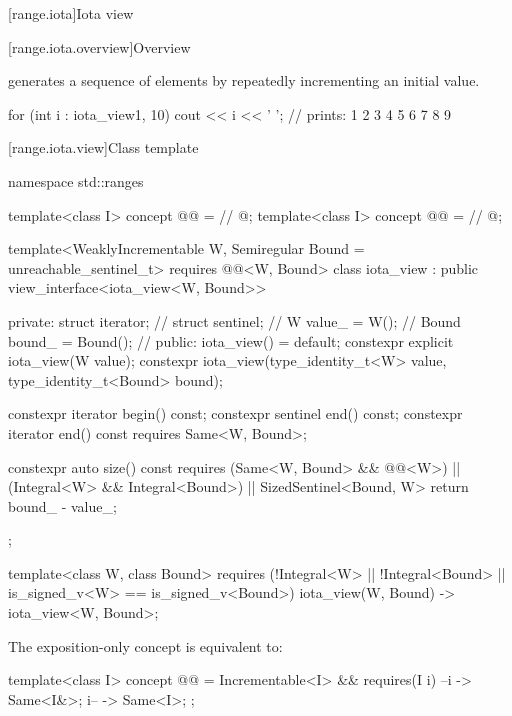 [range.iota]{Iota view}

[range.iota.overview]{Overview}

\pnum
{} generates a
sequence of elements by repeatedly incrementing an initial value.

\pnum
\begin{example}
\begin{codeblock}
for (int i : iota_view{1, 10})
  cout << i << ' '; // prints: 1 2 3 4 5 6 7 8 9
\end{codeblock}
\end{example}

[range.iota.view]{Class template }

\begin{codeblock}
namespace std::ranges {
  template<class I>
    concept @@ =     // \expos
      @\seebelow@;
  template<class I>
    concept @@ =       // \expos
      @\seebelow@;

  template<WeaklyIncrementable W, Semiregular Bound = unreachable_sentinel_t>
    requires @@<W, Bound>
  class iota_view : public view_interface<iota_view<W, Bound>> {
  private:
    struct iterator;            // \expos
    struct sentinel;            // \expos
    W value_ = W();             // \expos
    Bound bound_ = Bound();     // \expos
  public:
    iota_view() = default;
    constexpr explicit iota_view(W value);
    constexpr iota_view(type_identity_t<W> value,
                        type_identity_t<Bound> bound);

    constexpr iterator begin() const;
    constexpr sentinel end() const;
    constexpr iterator end() const requires Same<W, Bound>;

    constexpr auto size() const
      requires (Same<W, Bound> && @@<W>) ||
               (Integral<W> && Integral<Bound>) ||
               SizedSentinel<Bound, W>
    { return bound_ - value_; }
  };

  template<class W, class Bound>
    requires (!Integral<W> || !Integral<Bound> || is_signed_v<W> == is_signed_v<Bound>)
  iota_view(W, Bound) -> iota_view<W, Bound>;
}
\end{codeblock}

\pnum
The exposition-only  concept is equivalent to:
\begin{itemdecl}
template<class I>
  concept @@ =
    Incrementable<I> && requires(I i) {
      { --i } -> Same<I&>;
      { i-- } -> Same<I>;
    };
\end{itemdecl}

